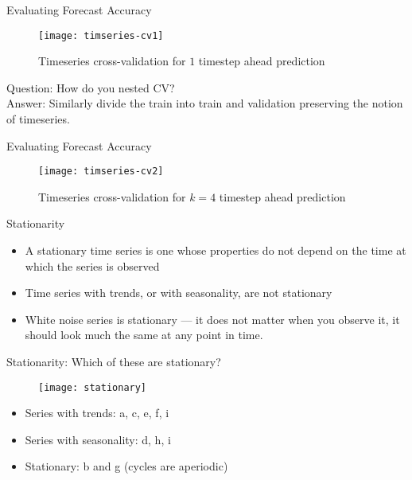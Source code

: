 \documentclass{beamer}
\begin{document}
\begin{frame}{Evaluating Forecast Accuracy}
\begin{figure}
	\centering
	\texttt{[image: timseries-cv1]}
	\caption{Timeseries cross-validation for $1$ timestep ahead prediction}
	\vspace{-15pt}
	\label{fig:timeseries-cv}
\end{figure}
Question: How do you nested CV? \\
Answer: Similarly divide the train into train and validation preserving the notion of timeseries.
\end{frame}

\begin{frame}{Evaluating Forecast Accuracy}
\begin{figure}
	\centering
	\texttt{[image: timseries-cv2]}
	\caption{Timeseries cross-validation for $k=4$ timestep ahead prediction}
	\vspace{-15pt}
	\label{fig:timeseries-cv}
\end{figure}

\end{frame}

\begin{frame}{Stationarity}
\begin{itemize}
	\item A stationary time series is one whose properties do not depend on the time at which the series is observed
	\item Time series with trends, or with seasonality, are not stationary 
	\item White noise series is stationary — it does not matter when you observe it, it should look much the same at any point in time.
\end{itemize}
\end{frame}


\begin{frame}{Stationarity: Which of these are stationary?}
\begin{figure}
	\centering
	\texttt{[image: stationary]}
	\vspace{-15pt}
	\label{fig:timeseries-cv}
\end{figure}
\begin{itemize}
	\item Series with trends: a, c, e, f, i
	\item Series with seasonality: d, h, i
	\item Stationary: b and g (cycles are aperiodic)
\end{itemize}
\end{frame}
\end{document}
